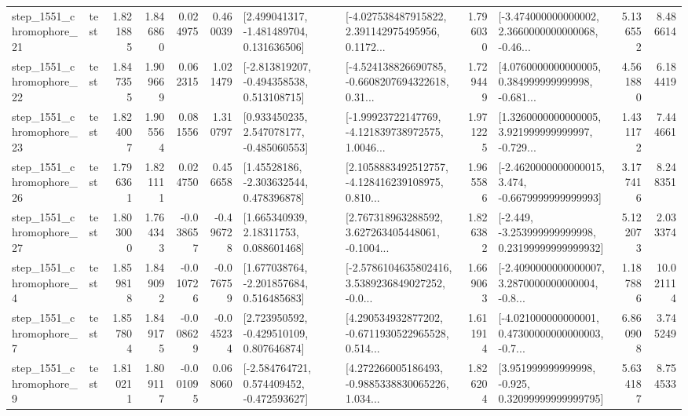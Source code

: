\begin{tabular}{llrrrrllrlrr}
 step\_1551\_chromophore\_21 &      test &      1.821885 &    1.846860 &      0.024975 &  0.460039 &    [2.499041317, -1.481489704, 0.131636506] &  [-4.027538487915822, 2.391142975495956, 0.1172... &       1.796030 &  [-3.474000000000002, 2.3660000000000068, -0.46... &            5.136552 &          8.486614 \\
 step\_1551\_chromophore\_22 &      test &      1.847355 &    1.909669 &      0.062315 &  1.021479 &   [-2.813819207, -0.494358538, 0.513108715] &  [-4.524138826690785, -0.6608207694322618, 0.31... &       1.729449 &  [4.0760000000000005, 0.384999999999998, -0.681... &            4.561880 &          6.184419 \\
 step\_1551\_chromophore\_23 &      test &      1.824007 &    1.905564 &      0.081556 &  1.310797 &    [0.933450235, 2.547078177, -0.485060553] &  [-1.99923722147769, -4.121839738972575, 1.0046... &       1.971225 &  [1.3260000000000005, 3.921999999999997, -0.729... &            1.431172 &          7.444661 \\
 step\_1551\_chromophore\_26 &      test &      1.796361 &    1.821111 &      0.024750 &  0.456658 &     [1.45528186, -2.303632544, 0.478396878] &  [2.1058883492512757, -4.128416239108975, 0.810... &       1.965586 &  [-2.4620000000000015, 3.474, -0.6679999999999993] &            3.177416 &          8.248351 \\
 step\_1551\_chromophore\_27 &      test &      1.803000 &    1.764343 &     -0.038657 & -0.496728 &      [1.665340939, 2.18311753, 0.088601468] &  [2.767318963288592, 3.627263405448061, -0.1004... &       1.826382 &  [-2.449, -3.253999999999998, 0.23199999999999932] &            5.122073 &          2.033374 \\
  step\_1551\_chromophore\_4 &      test &      1.859818 &    1.849092 &     -0.010726 & -0.076759 &    [1.677038764, -2.201857684, 0.516485683] &  [-2.5786104635802416, 3.5389236849027252, -0.0... &       1.669063 &  [-2.4090000000000007, 3.2870000000000004, -0.8... &            1.187886 &         10.021114 \\
  step\_1551\_chromophore\_7 &      test &      1.857804 &    1.849175 &     -0.008629 & -0.045234 &    [2.723950592, -0.429510109, 0.807646874] &  [4.290534932877202, -0.6711930522965528, 0.514... &       1.611914 &  [-4.021000000000001, 0.47300000000000003, -0.7... &            6.860908 &          3.745249 \\
  step\_1551\_chromophore\_9 &      test &      1.810211 &    1.809117 &     -0.001095 &  0.068060 &   [-2.584764721, 0.574409452, -0.472593627] &  [4.272266005186493, -0.9885338830065226, 1.034... &       1.826204 &   [3.951999999999998, -0.925, 0.32099999999999795] &            5.634187 &          8.754533 \\

\end{tabular}
